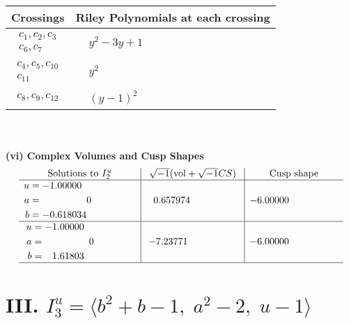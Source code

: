 \documentclass[1p]{elsarticle_modified}
\theoremstyle{definition}
\newcommand{\I}{\sqrt{-1}}
\begin{document}
\begin{tabular}{m{50pt}|m{274pt}}
Crossings & \hspace{64pt}Riley Polynomials at each crossing \\
\hline $$\begin{aligned}c_{1},c_{2},c_{3}\\c_{6},c_{7}\end{aligned}$$&$\begin{aligned}
&y^2-3 y+1
\end{aligned}$\\
\hline $$\begin{aligned}c_{4},c_{5},c_{10}\\c_{11}\end{aligned}$$&$\begin{aligned}
&y^2
\end{aligned}$\\
\hline $$\begin{aligned}c_{8},c_{9},c_{12}\end{aligned}$$&$\begin{aligned}
&(y-1)^2
\end{aligned}$\\
\hline
\end{tabular}\\~\\
\newpage\flushleft \textbf{(vi) Complex Volumes and Cusp Shapes}
$$\begin{array}{c|c|c}  
\text{Solutions to }I^u_{2}& \I (\text{vol} + \sqrt{-1}CS) & \text{Cusp shape}\\
 \hline 
\begin{aligned}
u &= -1.00000\phantom{ +0.000000I} \\
a &= \phantom{-0.000000 } 0 \\
b &= -0.618034\phantom{ +0.000000I}\end{aligned}
 & \phantom{-}0.657974\phantom{ +0.000000I} & -6.00000\phantom{ +0.000000I} \\ \hline\begin{aligned}
u &= -1.00000\phantom{ +0.000000I} \\
a &= \phantom{-0.000000 } 0 \\
b &= \phantom{-}1.61803\phantom{ +0.000000I}\end{aligned}
 & -7.23771\phantom{ +0.000000I} & -6.00000\phantom{ +0.000000I}\\
 \hline 
 \end{array}$$\newpage\newpage\renewcommand{\arraystretch}{1}
\centering \section*{III. $I^u_{3}= \langle b^2+b-1,\;a^2-2,\;u-1 \rangle$}
\end{document}
